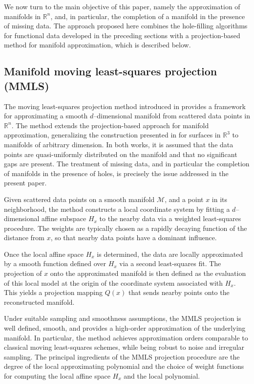 \documentclass[11pt,oneside,reqno]{amsart}
\theoremstyle{plain}
\numberwithin{equation}{section}
\begin{document}
We now turn to the main objective of this paper,
namely the approximation of manifolds in $\mathbb{R}^n$,
and, in particular, the completion of a manifold
in the presence of missing data.
The approach proposed here combines
the hole-filling algorithms for functional data
developed in the preceding sections
with a projection-based method
for manifold approximation,
which is described below.

\subsection{Manifold moving least-squares projection (MMLS)}\label{MMLS}
\hfill

The moving least-squares projection method introduced in
\cite{SoberLevin2016}
provides a framework for approximating a smooth
$d$–dimensional manifold from scattered data points
in $\mathbb{R}^n$.
The method extends the projection-based approach
for manifold approximation,
generalizing the construction presented in
\cite{Meshindependent}
for surfaces in $\mathbb{R}^3$
to manifolds of arbitrary dimension.
In both works, it is assumed that the data points
are quasi-uniformly distributed on the manifold
and that no significant gaps are present.
The treatment of missing data, and in particular
the completion of manifolds in the presence of holes,
is precisely the issue addressed in the present paper.

Given scattered data points on a smooth manifold $\mathcal{M}$,
and a point $x$ in its neighborhood,
the method constructs a local coordinate system
by fitting a $d$–dimensional affine subspace $H_x$
to the nearby data
via a weighted least-squares procedure.
The weights are typically chosen as a rapidly decaying function
of the distance from $x$, so that nearby data points
have a dominant influence.

Once the local affine space $H_x$ is determined,
the data are locally approximated by a smooth function
defined over $H_x$ via a second least-squares fit.
The projection of $x$ onto the approximated manifold
is then defined as the evaluation of this local model at the origin
of the coordinate system associated with $H_x$.
This yields a projection mapping $Q(x)$ that sends nearby points
onto the reconstructed manifold.

Under suitable sampling and smoothness assumptions,
the MMLS projection is well defined, smooth,
and provides a high-order approximation of the underlying manifold.
In particular, the method achieves approximation orders
comparable to classical moving least-squares schemes,
while being robust to noise and irregular sampling. The principal ingredients 
of the MMLS projection procedure 
are the degree 
of the local approximating polynomial 
and the choice of weight functions 
for computing 
the local affine space $H_x$ 
and the local polynomial.
\end{document}
